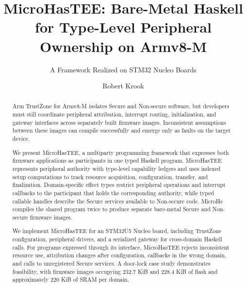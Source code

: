 \documentclass[sigconf]{acmart}
\begin{document}
\title{MicroHasTEE: Bare-Metal Haskell for Type-Level Peripheral Ownership on Armv8-M}
\subtitle{A Framework Realized on STM32 Nucleo Boards}

\author{Robert Krook}

\begin{abstract}
Arm TrustZone for Armv8-M isolates Secure and Non-secure software, but developers must still coordinate peripheral attribution, interrupt routing, initialization, and gateway interfaces across separately built firmware images.
Inconsistent assumptions between these images can compile successfully and emerge only as faults on the target device.
  
We present MicroHasTEE, a multiparty programming framework that expresses both firmware applications as participants in one typed Haskell program.
MicroHasTEE represents peripheral authority with type-level capability ledgers and uses indexed setup computations to track resource acquisition, configuration, transfer, and finalization.
Domain-specific effect types restrict peripheral operations and interrupt callbacks to the participant that holds the corresponding authority, while typed callable handles describe the Secure services available to Non-secure code.
MicroHs compiles the shared program twice to produce separate bare-metal Secure and Non-secure firmware images.
  
We implement MicroHasTEE for an STM32U5 Nucleo board, including TrustZone configuration, peripheral drivers, and a serialized gateway for cross-domain Haskell calls.
For programs expressed through its interface, MicroHasTEE rejects inconsistent resource use, attribution changes after configuration, callbacks in the wrong domain, and calls to unregistered Secure services.
A door-lock case study demonstrates feasibility, with firmware images occupying 232.7 KiB and 228.4 KiB of flash and approximately 220 KiB of SRAM per domain.
\end{abstract}
\end{document}
